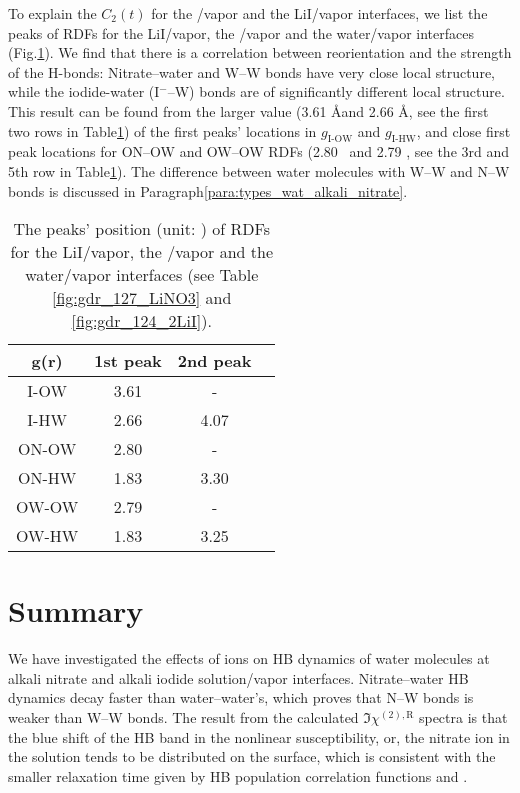 To explain the $C_2(t)$ for the \LiN/vapor and the LiI/vapor interfaces, 
we list the peaks of RDFs for the LiI/vapor, the \LiN/vapor and the water/vapor interfaces (Fig.\thinspace\ref{tab:rdf_I2wat_peaks}).
We find that there is a correlation between reorientation and the strength of the H-bonds:
Nitrate--water and W--W bonds have very close local structure, while the iodide-water (I$^-$--W) bonds are of significantly different local structure.
This result can be found from the larger value (3.61 \AA and 2.66 \AA, 
see the first two rows in Table\thinspace\ref{tab:rdf_I2wat_peaks}) of the first peaks' locations in $g_\text{I-OW}$ and $g_\text{I-HW}$,
and close first peak locations for ON--OW and OW--OW RDFs (2.80 \A\  and 2.79 \A, see the 3rd and 5th row in Table\thinspace\ref{tab:rdf_I2wat_peaks}). 
The difference between water molecules with W--W and N--W bonds is discussed in Paragraph\thinspace\ref{para:types_wat_alkali_nitrate}.
\begin{table}[H]
\centering
\caption{\label{tab:rdf_I2wat_peaks} 
The peaks' position (unit: \A) of RDFs for the LiI/vapor, the \LiN/vapor and the water/vapor interfaces (see Table \ref{fig:gdr_127_LiNO3} and \ref{fig:gdr_124_2LiI}). 
}
\begin{tabular}{cccc}
 g(r) & 1st peak & 2nd peak \\
\hline
 I-OW & 3.61 & - \\
 I-HW & 2.66 & 4.07 \\
 ON-OW & 2.80 & -\\
 ON-HW & 1.83 & 3.30 \\
 OW-OW & 2.79 & - \\
 OW-HW & 1.83 & 3.25 \\
\end{tabular}
\end{table} 

\section{Summary}
We have investigated the effects of ions on HB dynamics
of water molecules at alkali nitrate and alkali iodide solution/vapor interfaces.
Nitrate--water HB dynamics decay faster than water--water's, 
which proves that N--W bonds is weaker than W--W bonds. 
The result from the calculated $\Im\chi^{(2),\text{R}}$ spectra is that the blue shift of the HB band in the nonlinear susceptibility, 
or, the nitrate ion in the solution tends to be distributed on the surface, 
which is consistent with the smaller relaxation time given by HB population correlation functions \CHB and \SHB.


